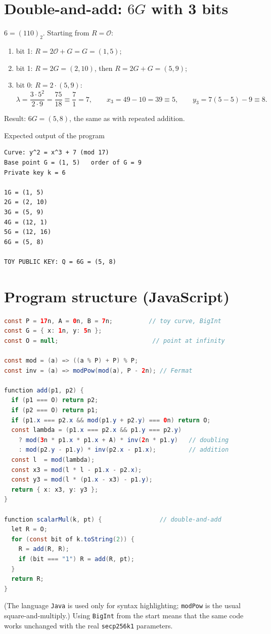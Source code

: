 \section{Double-and-add: $6G$ with 3 bits}

$6 = (110)_2$. Starting from $R = \mathcal{O}$:
\begin{enumerate}
  \item bit 1: $R = 2\mathcal{O} + G = G = (1,5)$;
  \item bit 1: $R = 2G = (2,10)$, then $R = 2G + G = (5,9)$;
  \item bit 0: $R = 2 \cdot (5,9)$:
  \[
    \lambda = \frac{3 \cdot 5^2}{2 \cdot 9} = \frac{75}{18} \equiv \frac{7}{1} = 7, \qquad
    x_3 = 49 - 10 = 39 \equiv 5, \qquad
    y_3 = 7(5 - 5) - 9 \equiv 8 .
  \]
\end{enumerate}
Result: $6G = (5, 8)$, the same as with repeated addition. \checkmark

\begin{framedex}{Expected output of the program}
\begin{lstlisting}[numbers=none]
Curve: y^2 = x^3 + 7 (mod 17)
Base point G = (1, 5)   order of G = 9
Private key k = 6

1G = (1, 5)
2G = (2, 10)
3G = (5, 9)
4G = (12, 1)
5G = (12, 16)
6G = (5, 8)

TOY PUBLIC KEY: Q = 6G = (5, 8)\end{lstlisting}
\end{framedex}

\section{Program structure (JavaScript)}

\begin{lstlisting}[language=Java]
const P = 17n, A = 0n, B = 7n;          // toy curve, BigInt
const G = { x: 1n, y: 5n };
const O = null;                          // point at infinity

const mod = (a) => ((a % P) + P) % P;
const inv = (a) => modPow(mod(a), P - 2n); // Fermat

function add(p1, p2) {
  if (p1 === O) return p2;
  if (p2 === O) return p1;
  if (p1.x === p2.x && mod(p1.y + p2.y) === 0n) return O;
  const lambda = (p1.x === p2.x && p1.y === p2.y)
    ? mod(3n * p1.x * p1.x + A) * inv(2n * p1.y)   // doubling
    : mod(p2.y - p1.y) * inv(p2.x - p1.x);         // addition
  const l  = mod(lambda);
  const x3 = mod(l * l - p1.x - p2.x);
  const y3 = mod(l * (p1.x - x3) - p1.y);
  return { x: x3, y: y3 };
}

function scalarMul(k, pt) {                // double-and-add
  let R = O;
  for (const bit of k.toString(2)) {
    R = add(R, R);
    if (bit === "1") R = add(R, pt);
  }
  return R;
}\end{lstlisting}
(The language \texttt{Java} is used only for syntax highlighting; \texttt{modPow} is the usual square-and-multiply.) Using \texttt{BigInt} from the start means that the same code works unchanged with the real \texttt{secp256k1} parameters.
